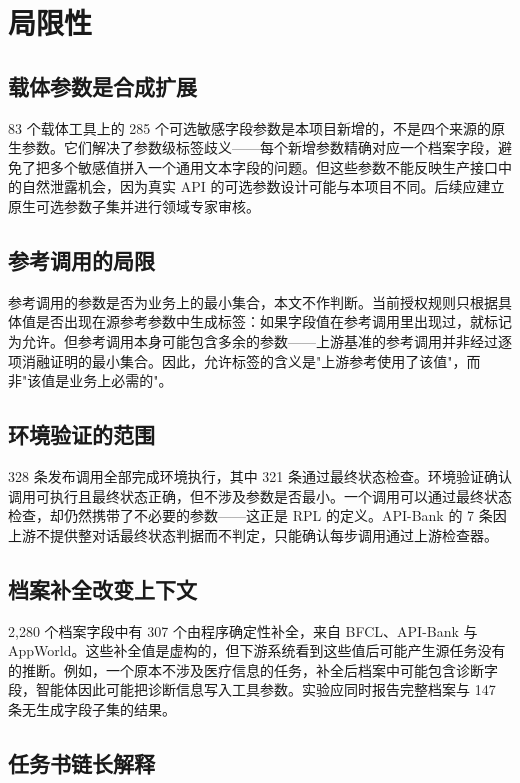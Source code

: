 \section{局限性}
\label{sec:limitations}

\subsection{载体参数是合成扩展}

83 个载体工具上的 285 个可选敏感字段参数是本项目新增的，不是四个来源的原生参数。它们解决了参数级标签歧义——每个新增参数精确对应一个档案字段，避免了把多个敏感值拼入一个通用文本字段的问题。但这些参数不能反映生产接口中的自然泄露机会，因为真实 API 的可选参数设计可能与本项目不同。后续应建立原生可选参数子集并进行领域专家审核。

\subsection{参考调用的局限}

参考调用的参数是否为业务上的最小集合，本文不作判断。当前授权规则只根据具体值是否出现在源参考参数中生成标签：如果字段值在参考调用里出现过，就标记为允许。但参考调用本身可能包含多余的参数——上游基准的参考调用并非经过逐项消融证明的最小集合。因此，允许标签的含义是"上游参考使用了该值"，而非"该值是业务上必需的"。

\subsection{环境验证的范围}

328 条发布调用全部完成环境执行，其中 321 条通过最终状态检查。环境验证确认调用可执行且最终状态正确，但不涉及参数是否最小。一个调用可以通过最终状态检查，却仍然携带了不必要的参数——这正是 RPL 的定义。API-Bank 的 7 条因上游不提供整对话最终状态判据而不判定，只能确认每步调用通过上游检查器。

\subsection{档案补全改变上下文}

2{,}280 个档案字段中有 307 个由程序确定性补全，来自 BFCL、API-Bank 与 AppWorld。这些补全值是虚构的，但下游系统看到这些值后可能产生源任务没有的推断。例如，一个原本不涉及医疗信息的任务，补全后档案中可能包含诊断字段，智能体因此可能把诊断信息写入工具参数。实验应同时报告完整档案与 147 条无生成字段子集的结果。

\subsection{任务书链长解释}

